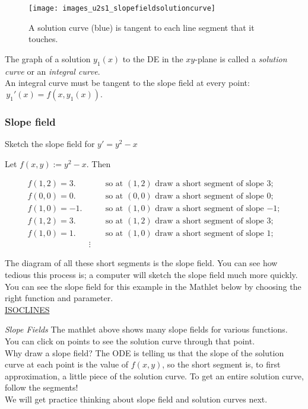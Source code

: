 \begin{figure}[ht!]
  \centering
  \texttt{[image: images\_u2s1\_slopefieldsolutioncurve]}
  \caption{A solution curve (blue) is tangent to each line segment that it touches.}
\end{figure}

The graph of a solution $y_1 (x)$ to the DE in the $xy$-plane is called a
\emph{\color{blue} solution curve} or an \emph{\color{blue} integral curve}. \\
An integral curve must be tangent to the slope field at every point:
$\displaystyle \, y_1'(x)=f\left(x, y_1(x)\right).$
\clearpage

\subsubsection{Slope field}

\begin{example}
  Sketch the slope field for $y'= y^2 - x$
\end{example}

\Solution Let $f(x,y):=y^2 - x$. Then

\begin{align*}
  f(1,2)=3. &\qquad \text{so at $(1,2)$ draw a short segment of slope $3$}; \\
  f(0,0)=0. &\qquad \text{so at $(0,0)$ draw a short segment of slope $0$}; \\
  f(1,0)=-1. &\qquad \text{so at $(1,0)$ draw a short segment of slope $-1$}; \\
  f(1,2)=3. &\qquad \text{so at $(1,2)$ draw a short segment of slope $3$}; \\
  f(1,0)=1. &\qquad \text{so at $(1,0)$ draw a short segment of slope $1$};\\
            & \vdots
\end{align*}

The diagram of all these short segments is the slope field.
You can see how tedious this process is; a computer will sketch the slope field much more quickly.
You can see the slope field for this example in the Mathlet below by choosing the right function and parameter.\\

\href{http://mathlets.org/mathlets/isoclines/}
{ISOCLINES}

\emph{\color{blue}Slope Fields} The mathlet above shows many slope fields for various functions.
You can click on points to see the solution curve through that point. \\
Why draw a slope field?
The ODE is telling us that the slope of the solution curve at each point is the value of
$f(x,y)$, so the short segment is, to first approximation,
a little piece of the solution curve.
To get an entire solution curve, follow the segments! \\
We will get practice thinking about slope field and solution curves next.

